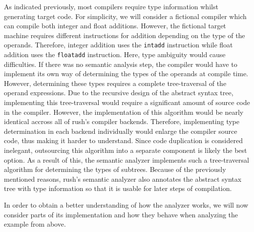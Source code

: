 As indicated previously, most compilers require type information whilst
generating target code. For simplicity, we will consider a fictional compiler
which can compile both integer and float additions. However, the fictional
target machine requires different instructions for addition depending on the
type of the operands. Therefore, integer addition uses the \texttt{intadd} instruction
while float addition uses the \texttt{floatadd} instruction. Here, type ambiguity would
cause difficulties. If there was no semantic analysis step, the compiler would
have to implement its own way of determining the types of the operands at
compile time. However, determining these types requires a complete
tree-traversal of the operand expressions. Due to the recursive design of the
abstract syntax tree, implementing this tree-traversal would require a
significant amount of source code in the compiler. However, the implementation
of this algorithm would be nearly identical accross all of rush's compiler
backends. Therefore, implementing type determination in each backend
individually would enlarge the compiler source code, thus making it harder to
understand. Since code duplication is considered inelegant, outsourcing this
algorithm into a separate component is likely the best option. As a result of
this, the semantic analyzer implements such a tree-traversal algorithm for
determining the types of subtrees. Because of the previously mentioned reasons,
rush's semantic analyzer also annotates the abstract syntax tree with type
information so that it is usable for later steps of compilation.

In order to obtain a better understanding of how the analyzer works, we will now
consider parts of its implementation and how they behave when analyzing the
example from above.

